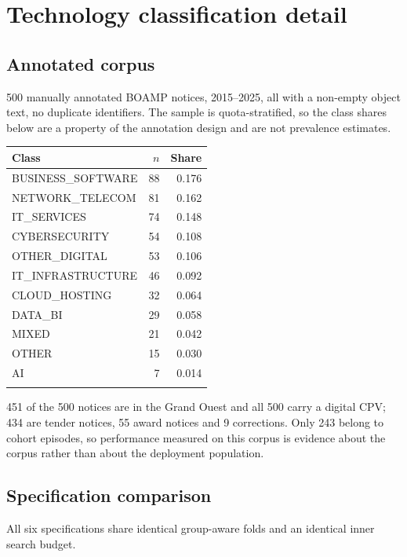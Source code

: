 \section{Technology classification detail}
\label{app:nlp}

\subsection*{Annotated corpus}

500 manually annotated BOAMP notices, 2015--2025, all with a non-empty object text, no duplicate identifiers.
The sample is quota-stratified, so the class shares below are a property of the annotation design and are not
prevalence estimates.

\begin{longtable}[]{@{}lrr@{}}
\toprule\noalign{}
Class & $n$ & Share \\
\midrule\noalign{}
\endhead
BUSINESS\_SOFTWARE & 88 & 0.176 \\
NETWORK\_TELECOM & 81 & 0.162 \\
IT\_SERVICES & 74 & 0.148 \\
CYBERSECURITY & 54 & 0.108 \\
OTHER\_DIGITAL & 53 & 0.106 \\
IT\_INFRASTRUCTURE & 46 & 0.092 \\
CLOUD\_HOSTING & 32 & 0.064 \\
DATA\_BI & 29 & 0.058 \\
MIXED & 21 & 0.042 \\
OTHER & 15 & 0.030 \\
AI & 7 & 0.014 \\
\bottomrule\noalign{}
\end{longtable}

451 of the 500 notices are in the Grand Ouest and all 500 carry a digital CPV; 434 are tender notices, 55
award notices and 9 corrections. Only 243 belong to cohort episodes, so performance measured on this corpus
is evidence about the corpus rather than about the deployment population.

\subsection*{Specification comparison}

All six specifications share identical group-aware folds and an identical inner search budget.

